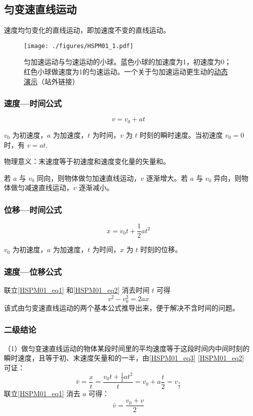 \subsection{匀变速直线运动}
速度均匀变化的直线运动，即加速度不变的直线运动。
\begin{figure}[ht]
\centering
\texttt{[image: ./figures/HSPM01\_1.pdf]}
\caption{匀加速运动与匀速运动的小球。蓝色小球的加速度为1，初速度为0；红色小球做速度为1的匀速运动。一个关于匀加速运动更生动的\href{https://www.geogebra.org/m/kX9C9yDw}{动态演示}（站外链接）} \label{HSPM01_fig1}
\end{figure}
\subsubsection{速度—时间公式}
\begin{equation}\label{HSPM01_eq1}
v= v_0+ a t
\end{equation}

$v_0$ 为初速度，$a$ 为加速度，$t$ 为时间，$v$ 为 $t$ 时刻的瞬时速度。当初速度 $v_0=0$ 时，有 $v=a t$.

物理意义：末速度等于初速度和速度变化量的矢量和。

若 $a$ 与 $v_0$ 同向，则物体做匀加速直线运动，$v$ 逐渐增大。若 $a$ 与 $v_0$ 异向，则物体做匀减速直线运动，$v$ 逐渐减小。

\subsubsection{位移—时间公式}
\begin{equation}\label{HSPM01_eq2}
x=v_0 t+\frac12 at^2
\end{equation}

$v_0$ 为初速度，$a$ 为加速度，$t$ 为时间，$x$ 为 $t$ 时刻的位移。

\subsubsection{速度—位移公式}
联立\autoref{HSPM01_eq1} 和\autoref{HSPM01_eq2} 消去时间 $t$ 可得
\begin{equation}\label{HSPM01_eq4}
v^2-v_0^2=2ax
\end{equation}
该式由匀变速直线运动的两个基本公式推导出来，便于解决不含时间的问题。

\subsubsection{二级结论}
（1）做匀变速直线运动的物体某段时间里的平均速度等于这段时间内中间时刻的瞬时速度，且等于初、末速度矢量和的一半，由\autoref{HSPM01_eq3} \autoref{HSPM01_eq2} 可证：
\begin{equation}
\bar v=\frac xt=\frac{v_0t+\frac 12at^2}{t}=v_0+a\frac t2=v_{\frac t2}
\end{equation}
联立\autoref{HSPM01_eq1} 消去 $a$ 可得：
\begin{equation}
\bar v=\frac{v_0+v}{2}
\end{equation}

